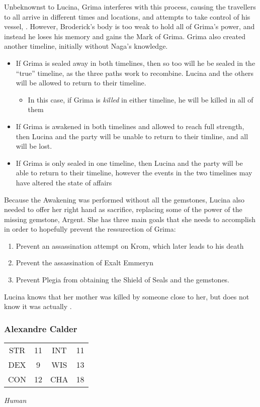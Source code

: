 Unbeknownst to Lucina, Grima interferes with this process, causing the travellers to all arrive in different times and locations, and attempts to take control of his vessel, . However, Broderick's body is too weak to hold all of Grima's power, and instead he loses his memory and gains the Mark of Grima. Grima also created another timeline, initially without Naga's knowledge. 
\begin{itemize}
\item If Grima is sealed away in both timelines, then so too will he be sealed in the ``true'' timeline, as the three paths work to recombine. Lucina and the others will be allowed to return to their timeline.
\begin{itemize}
\item In this case, if Grima is \textit{killed} in either timeline, he will be killed in all of them
\end{itemize}
\item If Grima is awakened in both timelines and allowed to reach full strength, then Lucina and the party will be unable to return to their timline, and all will be lost.
\item If Grima is only sealed in one timeline, then Lucina and the party will be able to return to their timeline, however the events in the two timelines may have altered the state of affairs
\end{itemize}

Because the Awakening was performed without all the gemstones, Lucina also needed to offer her right hand as sacrifice, replacing some of the power of the missing gemstone, Argent. She has three main goals that she needs to accomplish in order to hopefully prevent the ressurection of Grima:
\begin{enumerate}
\item Prevent an assassination attempt on Krom, which later leads to his death
\item Prevent the assassination of Exalt Emmeryn
\item Prevent Plegia from obtaining the Shield of Seals and the gemstones.
\end{enumerate}

Lucina knows that her mother was killed by someone close to her, but does not know it was actually .

\subsubsection{Alexandre Calder}
\label{people:alcalde}
\begin{center}
\begin{tabular}{c c|c c}
STR & 11 & INT & 11\\
DEX & 9 & WIS & 13 \\
CON & 12 & CHA & 18 \end{tabular}\end{center}
\textit{Human}\\

